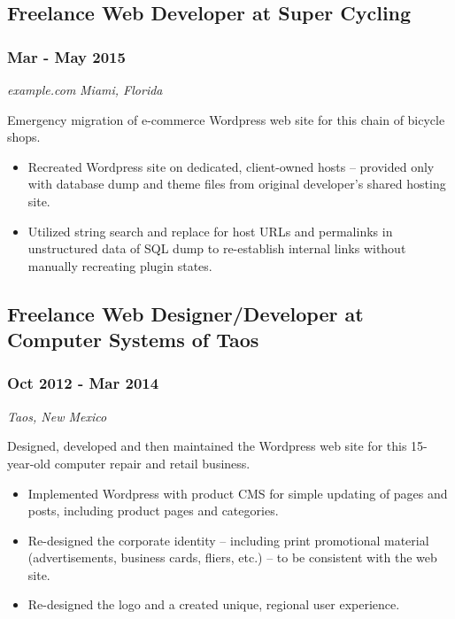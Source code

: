 \documentclass[letterpaper]{article}
\begin{document}
\subsection{Freelance Web Developer at Super Cycling}
\label{sec-3-2}
\subsubsection{Mar - May 2015}
\label{sec-3-2-1}
\emph{example.com} \hfill \emph{Miami, Florida}\\
\vspace{0.1in}

Emergency migration of e-commerce Wordpress web site for this chain of bicycle shops.
\vspace{0.1in}

\begin{itemize}
\item Recreated Wordpress site on dedicated, client-owned hosts -- provided only with database dump and theme files from original developer's shared hosting site.
\item Utilized string search and replace for host URLs and permalinks in unstructured data of SQL dump to re-establish internal links without manually recreating plugin states.
\end{itemize}

\subsection{Freelance Web Designer/Developer at Computer Systems of Taos}
\label{sec-3-3}
\subsubsection{Oct 2012 - Mar 2014}
\label{sec-3-3-1}
\emph{Taos, New Mexico}\\
\vspace{0.1in}

Designed, developed and then maintained the Wordpress web site for this 15-year-old computer repair and retail business.
\vspace{0.1in}

\begin{itemize}
\item Implemented Wordpress with product CMS for simple updating of pages and posts, including product pages and categories.
\item Re-designed the corporate identity -- including print promotional material (advertisements, business cards, fliers, etc.) -- to be consistent with the web site.
\item Re-designed the logo and a created unique, regional user experience.
\end{itemize}
\end{document}
